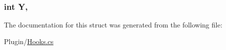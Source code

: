 \subsubsection[{Y}]{\setlength{\rightskip}{0pt plus 5cm}int Y\hspace{0.3cm}{\ttfamily [get]}, {\ttfamily [set]}}\label{structOTA_1_1Plugin_1_1HookArgs_1_1InvasionNPCSpawn_aa482c4cc86a24474e4fb19b5b5978778}


The documentation for this struct was generated from the following file\+:\begin{DoxyCompactItemize}
\item 
Plugin/\hyperlink{Hooks_8cs}{Hooks.\+cs}\end{DoxyCompactItemize}
